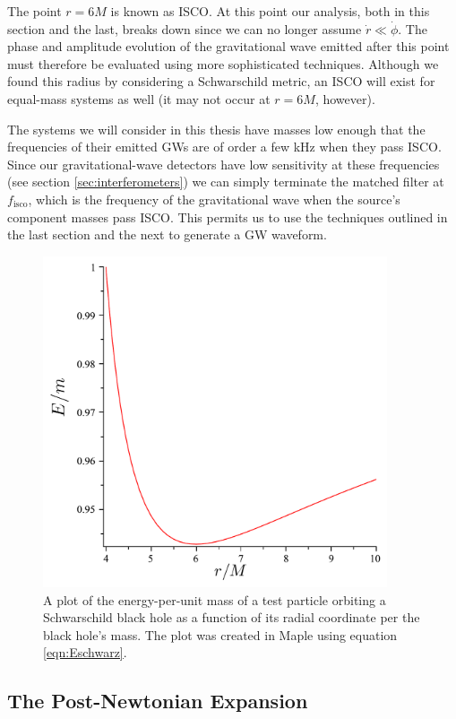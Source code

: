The point $r=6M$ is known as \ac{ISCO}. At this point our analysis, both in this section and the last, breaks down since we can no longer assume $\dot{r} \ll \dot{\phi}$. The phase and amplitude evolution of the gravitational wave emitted after this point must therefore be evaluated using more sophisticated techniques. Although we found this radius by considering a Schwarschild metric, an \ac{ISCO} will exist for equal-mass systems as well (it may not occur at $r=6M$, however).

The systems we will consider in this thesis have masses low enough that the frequencies of their emitted \acp{GW} are of order a few kHz when they pass \ac{ISCO}. Since our gravitational-wave detectors have low sensitivity at these frequencies (see section \ref{sec:interferometers}) we can simply terminate the matched filter at $f_{\mathrm{isco}}$, which is the frequency of the gravitational wave when the source's component masses pass \ac{ISCO}. This permits us to use the techniques outlined in the last section and the next to generate a \ac{GW} waveform.

\begin{figure}[tbp]
\center
\includegraphics[width=4in]{figures/Eofrplot.pdf}
\caption{A plot of the energy-per-unit mass of a test particle orbiting a Schwarschild black hole as a function of its radial coordinate per the black hole's mass. The plot was created in Maple using equation \ref{eqn:Eschwarz}.}
\end{figure}

\subsection{The Post-Newtonian Expansion}


